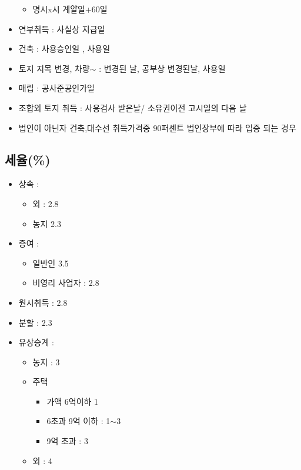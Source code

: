 \documentclass{oblivoir}
\begin{document}
\begin{multicols}{2}
\begin{itemize}
  \begin{itemize}
  \itemsep1pt\parskip0pt
  \item
    명시x시 계얄일+60일
  \end{itemize}
\item
  연부취득 : 사실상 지급일
\item
  건축 : 사용승인일 , 사용일
\item
  토지 지목 변경, 차량$\sim$ : 변경된 날, 공부상 변경된날,
  사용일
\item
  매립 : 공사준공인가일
\item
  조합외 토지 취득 : 사용검사 받은날/ 소유권이전 고시일의 다음 날
\item
  법인이 아닌자 건축,대수선 취득가격중 90퍼센트 법인장부에 따라 입증
  되는 경우
\end{itemize}

\subsection{세율(\%)}\label{uxc138uxc728}

\begin{itemize}
\itemsep1pt\parskip0pt
\item
  상속 :

  \begin{itemize}
  \itemsep1pt\parskip0pt
  \item
    외 : 2.8
  \item
    농지 2.3
  \end{itemize}
\item
  증여 :

  \begin{itemize}
  \itemsep1pt\parskip0pt
  \item
    일반인 3.5
  \item
    비영리 사업자 : 2.8
  \end{itemize}
\item
  원시취득 : 2.8
\item
  분할 : 2.3
\item
  유상승계 :

  \begin{itemize}
  \itemsep1pt\parskip0pt
  \item
    농지 : 3
  \item
    주택

    \begin{itemize}
    \itemsep1pt\parskip0pt
    \item
      가액 6억이하 1
    \item
      6초과 9억 이하 : 1$\sim$3
    \item
      9억 초과 : 3
    \end{itemize}
  \item
    외 : 4
  \end{itemize}
\end{itemize}


\end{multicols}
\end{document}
